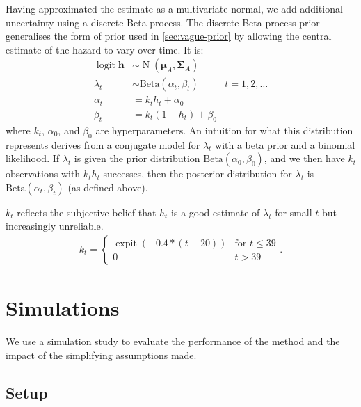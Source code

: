 \documentclass[12pt]{article}
\def\dist{\sim}
\DeclareMathOperator{\logit}{logit}
\DeclareMathOperator{\MNorm}{N}
\DeclareMathOperator{\expit}{expit}
\newcommand\matr{\bm}
\renewcommand{\vec}[1]{\bm{#1}}
\begin{document}
Having approximated the estimate as a multivariate normal, we add additional uncertainty using a discrete Beta process.
The discrete Beta process prior~\citep{ibrahimBayesian,sunStatisticala} generalises the form of prior used in \cref{sec:vague-prior} by allowing the central estimate of the hazard to vary over time.
It is:
\begin{align}
  \logit \vec{h} &\dist \MNorm(\vec{\mu}_A, \matr{\Sigma}_A) \\
  \lambda_t &\dist \text{Beta}(\alpha_t, \beta_t) &t = 1, 2, \dots \\
  \alpha_t &= k_t h_t + \alpha_0 \\
  \beta_t &= k_t (1 - h_t) + \beta_0
\end{align}
where $k_t$, $\alpha_0$, and $\beta_0$ are hyperparameters.
An intuition for what this distribution represents derives from a conjugate model for $\lambda_t$ with a beta prior and a binomial likelihood.
If $\lambda_t$ is given the prior distribution $\text{Beta}(\alpha_0, \beta_0)$, and we then have $k_t$ observations with $k_t h_t$ successes, then the posterior distribution for $\lambda_t$ is $\text{Beta}(\alpha_t, \beta_t)$ (as defined above).

$k_t$ reflects the subjective belief that $h_t$ is a good estimate of $\lambda_t$ for small $t$ but increasingly unreliable.
\begin{align}
k_t = \begin{cases}
  \expit(-0.4 * (t - 20)) &\text{for $t \leq 39$} \\
  0 &t > 39
\end{cases}.
\end{align}

\section{Simulations}


We use a simulation study to evaluate the performance of the method and the impact of the simplifying assumptions made.

\subsection{Setup}
\end{document}
